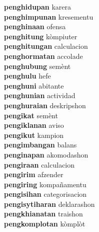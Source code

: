 \textbf{penghidupan } karera \\
\textbf{penghimpunan } kresementu \\
\textbf{penghinaan } ofensa \\
\textbf{penghitung } kòmpiuter \\
\textbf{penghitungan } calculacion \\
\textbf{penghormatan } accolade \\
\textbf{penghubung } semènt \\
\textbf{penghulu } hefe \\
\textbf{penghuni } abitante \\
\textbf{penghunian } actividad \\
\textbf{penghuraian } deskripshon \\
\textbf{pengikat } semènt \\
\textbf{pengiklanan } aviso \\
\textbf{pengikut } kampion \\
\textbf{pengimbangan } balans \\
\textbf{penginapan } akomodashon \\
\textbf{pengiraan } calculacion \\
\textbf{pengirim } afzender \\
\textbf{pengiring } kompañamentu \\
\textbf{pengisihan } categorisacion \\
\textbf{pengisytiharan } deklarashon \\
\textbf{pengkhianatan } traishon \\
\textbf{pengkomplotan } kòmplòt \\
